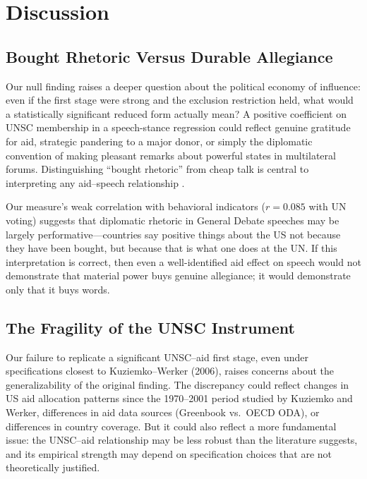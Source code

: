 \section{Discussion}\label{sec:discussion}

\subsection{Bought Rhetoric Versus Durable Allegiance}

Our null finding raises a deeper question about the political economy of influence: even if the first stage were strong and the exclusion restriction held, what would a statistically significant reduced form actually mean? A positive coefficient on UNSC membership in a speech-stance regression could reflect genuine gratitude for aid, strategic pandering to a major donor, or simply the diplomatic convention of making pleasant remarks about powerful states in multilateral forums. Distinguishing ``bought rhetoric'' from cheap talk is central to interpreting any aid--speech relationship \citep{fearon1994domestic,fearon1997signaling}.

Our measure's weak correlation with behavioral indicators ($r=0.085$ with UN voting) suggests that diplomatic rhetoric in General Debate speeches may be largely performative---countries say positive things about the US not because they have been bought, but because that is what one does at the UN. If this interpretation is correct, then even a well-identified aid effect on speech would not demonstrate that material power buys genuine allegiance; it would demonstrate only that it buys words.

\subsection{The Fragility of the UNSC Instrument}

Our failure to replicate a significant UNSC--aid first stage, even under specifications closest to Kuziemko--Werker (2006), raises concerns about the generalizability of the original finding. The discrepancy could reflect changes in US aid allocation patterns since the 1970--2001 period studied by Kuziemko and Werker, differences in aid data sources (Greenbook vs.\ OECD ODA), or differences in country coverage. But it could also reflect a more fundamental issue: the UNSC--aid relationship may be less robust than the literature suggests, and its empirical strength may depend on specification choices that are not theoretically justified.

